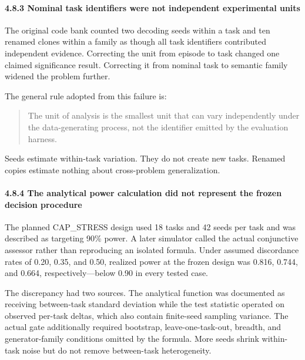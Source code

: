 \documentclass[
  9pt,
  letterpaper,
]{article}
\begin{document}
\hypertarget{483-nominal-task-identifiers-were-not-independent-experimental-units}{%
\paragraph{4.8.3 Nominal task identifiers were not independent
experimental
units}\label{483-nominal-task-identifiers-were-not-independent-experimental-units}}

The original code bank counted two decoding seeds within a task and ten
renamed clones within a family as though all task identifiers
contributed independent evidence. Correcting the unit from episode to
task changed one claimed significance result. Correcting it from nominal
task to semantic family widened the problem further.

The general rule adopted from this failure is:

\begin{quote}
The unit of analysis is the smallest unit that can vary independently
under the data-generating process, not the identifier emitted by the
evaluation harness.
\end{quote}

Seeds estimate within-task variation. They do not create new tasks.
Renamed copies estimate nothing about cross-problem generalization.

\hypertarget{484-the-analytical-power-calculation-did-not-represent-the-frozen-decision-procedure}{%
\paragraph{4.8.4 The analytical power calculation did not represent the
frozen decision
procedure}\label{484-the-analytical-power-calculation-did-not-represent-the-frozen-decision-procedure}}

The planned CAP\_STRESS design used 18 tasks and 42 seeds per task and
was described as targeting 90\% power. A later simulator called the
actual conjunctive assessor rather than reproducing an isolated formula.
Under assumed discordance rates of 0.20, 0.35, and 0.50, realized power
at the frozen design was 0.816, 0.744, and 0.664, respectively---below
0.90 in every tested case.

The discrepancy had two sources. The analytical function was documented
as receiving between-task standard deviation while the test statistic
operated on observed per-task deltas, which also contain finite-seed
sampling variance. The actual gate additionally required bootstrap,
leave-one-task-out, breadth, and generator-family conditions omitted by
the formula. More seeds shrink within-task noise but do not remove
between-task heterogeneity.
\end{document}
